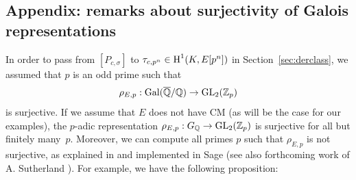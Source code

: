 \documentclass{article} \usepackage[active]{srcltx}
\begin{document}
{

}

\textwidth
{
}


\eject
\mbox{}
\textwidth




\subsection{Appendix: remarks about surjectivity of Galois representations}

In order to pass from $[P_{c,\sigma}]$ to $\tau_{c,p^n} \in \operatorname{H}^1(K,E[p^n])$
in Section~\ref{sec:derclass},
we assumed that $p$ is an odd prime such that
$$\rho_{E,p}:\operatorname{Gal}(\overline{\mathbb{Q}}/\mathbb{Q})\to\operatorname{GL}_2(\mathbb{Z}_p)$$ 
is surjective.  If we assume that $E$ does not have CM (as will be the
case for our examples), the $p$-adic representation $\rho_{E,p}:G_{\mathbb{Q}}
\to \operatorname{GL}_2(\mathbb{Z}_p)$ is surjective for all but finitely many~$p$.
Moreover, we can compute all primes $p$ such that
$\rho_{E,p}$ is not surjective, as explained in \cite[\S2.1]{bsdalg1}
and implemented in Sage
(see also forthcoming work of A. Sutherland
\cite{sutherland:cmi_talk_on_image}).  For example, we have the
following proposition:
\end{document}
